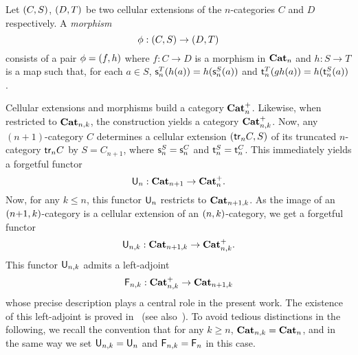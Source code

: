 Let $(C,S)$, $(D,T)$ be two cellular extensions of the
$n$-categories $C$ and $D$ respectively.  A {\em morphism}
 \[\phi:(C,S)\to(D,T)\]
 consists of a pair $\phi=(f,h)$ where $f:C\to D$ is a morphism in
 $\mathbf{Cat}_{n}$ and $h:S\to T$ is a map such that, for each $a\in S$, $\mathsf{s}_{n}^T(h(a))=h(\mathsf{s}_{n}^S(a))$ and $\mathsf{t}_{n}^T(g
 h(a))=h(\mathsf{t}_{n}^S(a))$.

 Cellular extensions and morphisms build a category $\mathbf{Cat}_{n}^{+}$. Likewise, when restricted to $\mathbf{Cat}_{n,k}$, the
 construction yields a category $\mathbf{Cat}_{n,k}^{+}$. Now,
 any $(n{+}1)$-category $C$ determines a cellular extension $(\mathsf{tr}_{n} C,S)$ of its truncated $n$-category $\mathsf{tr}_{n} C$ by
 $S=C_{n+1}$, where $\mathsf{s}_{n}^S=\mathsf{s}_{n}^C$ and $\mathsf{t}_{n}^S=\mathsf{t}_{n}^C$.
 This immediately yields a forgetful functor
 \[\mathsf{U}_{n}:\mathbf{Cat}_{n+1}\to \mathbf{Cat}_{n}^{+}.\]
Now, for any $k\leq n$, this functor $\mathsf{U}_{n}$ restricts to
$\mathbf{Cat}_{n+1,k}$. As the image of an $(n{+}1,k)$-category is a
cellular extension of an
$(n,k)$-category, we get a forgetful functor
\[\mathsf{U}_{n,k}:\mathbf{Cat}_{n+1,k}\to \mathbf{Cat}_{n,k}^{+}.\]
This functor $\mathsf{U}_{n,k}$ admits a left-adjoint
\[\mathsf{F}_{n,k}:\mathbf{Cat}_{n,k}^{+}\to \mathbf{Cat}_{n+1,k}\]
whose precise description plays a central role in the present
work. The existence of this left-adjoint is proved
in~\cite{batanin:comfmg} (see also~\cite[Ch.18]{abgmmm:polybk}). To
avoid tedious distinctions in the following, we recall the convention that
for any $k\geq n$, $\mathbf{Cat}_{n,k}=\mathbf{Cat}_{n}$, and in the same way we set
$\mathsf{U}_{n,k}=\mathsf{U}_{n}$ and $\mathsf{F}_{n,k}=\mathsf{F}_{n}$ in this case.

